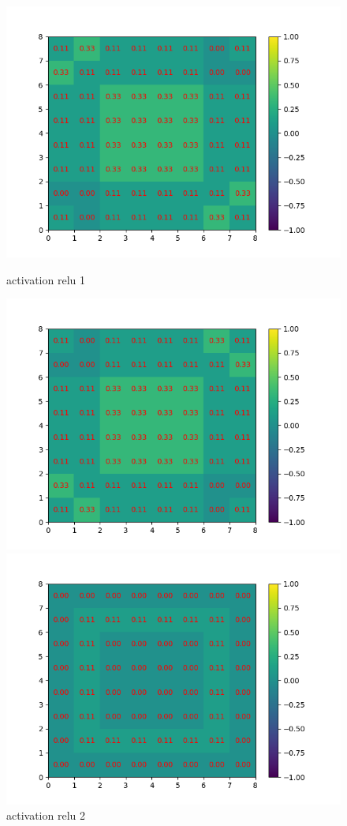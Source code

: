 \begin{figure}[h]
        \includegraphics[width=\textwidth]{img/cnn_exemple/square/activation_relu_1.png}
        \caption{activation relu 1}
    \endminipage\hfill
        \includegraphics[width=\textwidth]{img/cnn_exemple/square/activation_relu_2.png}
        \caption{activation relu 2}
    \endminipage\hfill
        \includegraphics[width=\textwidth]{img/cnn_exemple/square/activation_relu_3.png}

\end{figure}
